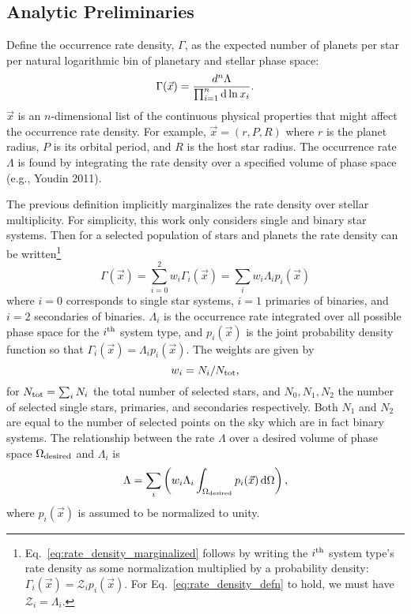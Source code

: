 \subsection{Analytic Preliminaries}
\label{sec:analytic_preliminaries}

Define the occurrence rate density, $\Gamma$,
as the expected number of planets per star per natural logarithmic bin 
of planetary and stellar phase space:
\begin{equation}
\Gamma(\vec{x}) = \frac{d^n\Lambda}{\prod_{i=1}^{n} {\rm d} \ln x_i  }.
\label{eq:rate_density_defn}
\end{equation}
$\vec{x}$ is an $n$-dimensional list of the continuous physical properties 
that might affect the occurrence rate density. 
For example,
$\vec{x}=(r,P,R)$ where $r$ is the planet radius, $P$ is its orbital period, 
and $R$ is the host star radius.
The occurrence rate $\Lambda$ is found by integrating the rate density over a 
specified volume of phase space (e.g., Youdin 2011).


The previous definition implicitly marginalizes the rate density over stellar 
multiplicity.
For simplicity, this work only considers single and binary star systems.
Then for a selected population of stars and planets the rate density can be 
written\footnote{
    Eq.~\ref{eq:rate_density_marginalized} follows by writing the $i^{\rm 
        th}$ system type's rate density as some normalization multiplied by a 
    probability density:
    $\Gamma_i(\vec{x}) = \mathcal{Z}_i p_i(\vec{x})$.
    For Eq.~\ref{eq:rate_density_defn} to hold, we must have $\mathcal{Z}_i = 
    \Lambda_i$.
}
\begin{equation}
\Gamma(\vec{x})
= \sum_{i=0}^{2} w_i \Gamma_i(\vec{x})
= \sum_i w_i \Lambda_i p_i(\vec{x})
\label{eq:rate_density_marginalized}
\end{equation}
where $i=0$ corresponds to single star systems, $i=1$ primaries of binaries, 
and $i=2$ secondaries of binaries.
$\Lambda_i$ is the occurrence rate integrated over all possible phase space  
for the $i^{\rm th}$ system type, and $p_i(\vec{x})$ is the joint 
probability density function so that $\Gamma_i(\vec{x}) = \Lambda_i 
p_i(\vec{x})$.
The weights are given by 
\begin{equation}
w_i = N_i/N_{\rm tot},
\end{equation}
for $N_{\rm tot} = \sum_i N_i$ the total number of selected stars, and 
$N_0,N_1,N_2$ the number of selected single stars, primaries, and 
secondaries respectively.
Both $N_1$ and $N_2$ are equal to the number of selected points on 
the sky which are in fact binary systems.
The relationship between the rate $\Lambda$ over a desired volume of 
phase space $\Omega_{\rm desired}$ and $\Lambda_i$ is
\begin{equation}
\Lambda = \sum_i
\left(
w_i \Lambda_i \int_{\Omega_{\rm desired}} p_i(\vec{x}) \,{\rm d}\Omega
\right),
\label{eq:occ_rate}
\end{equation}
where $p_i(\vec{x})$ is assumed to be normalized to unity.

